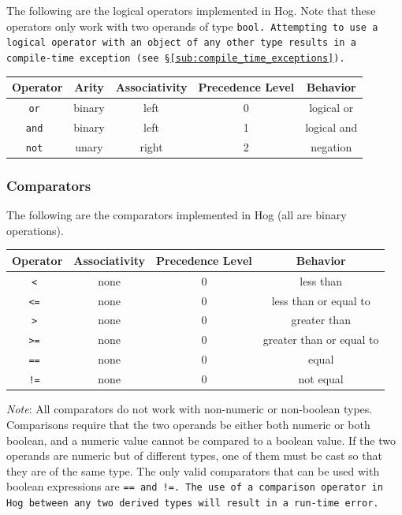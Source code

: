 \documentclass{book}
\begin{document}
The following are the logical operators implemented in Hog. Note that these
operators only work with two operands of type \tt bool\rm. Attempting to use a
logical operator with an object of any other type results in a compile-time
exception (see \S \ref{sub:compile_time_exceptions}).

\begin{center}
\begin{tabular}{|c|c|c|c|c|}

\hline \textbf{Operator} & \textbf{Arity} & \textbf{Associativity} &
\textbf{Precedence Level} & \textbf{Behavior} \\ \hline
\tt or \rm & binary & left & 0 & logical or \\ \hline
\tt and \rm & binary & left & 1 & logical and \\ \hline
\tt not \rm & unary & right & 2 & negation \\ \hline
\end{tabular}
\end{center}


\subsubsection{Comparators} %
\label{ssub:comparators}

The following are the comparators implemented in Hog (all are binary operations).

\begin{center}
\begin{tabular}{|c|c|c|c|}

\hline \textbf{Operator} & \textbf{Associativity} &
\textbf{Precedence Level} & \textbf{Behavior} \\ \hline
\tt < \rm & none & 0 & less than \\ \hline
\tt <= \rm & none & 0 & less than or equal to \\ \hline
\tt > \rm & none & 0 & greater than \\ \hline
\tt >= \rm & none & 0 & greater than or equal to \\ \hline
\tt == \rm & none & 0 & equal \\ \hline
\tt != \rm & none & 0 & not equal \\ \hline

\end{tabular}
\end{center}

\emph{Note}: All comparators do not work with non-numeric or non-boolean types.
Comparisons require that the two operands be either both numeric or both
boolean, and a numeric value cannot be compared to a boolean value. If the two
operands are numeric but of different types, one of them must be cast so that
they are of the same type. The only valid comparators that can be used with
boolean expressions are \tt == \rm and \tt !=\rm. The use of a comparison
operator in Hog between any two derived types will result in a run-time error.
\end{document}
